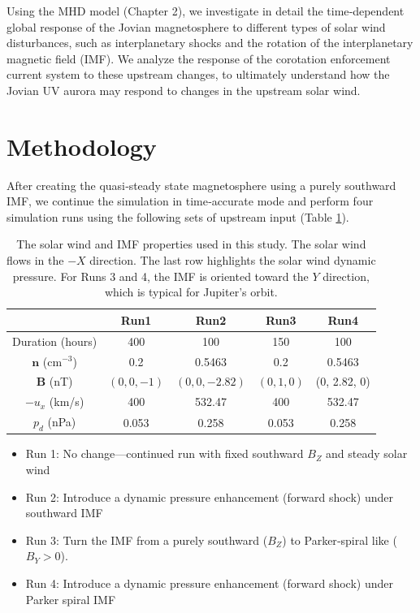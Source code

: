 Using the MHD model (Chapter 2), we investigate in detail the time‐dependent global response of the Jovian magnetosphere to different types of solar wind disturbances, such as interplanetary shocks and the rotation of the interplanetary magnetic field (IMF). We analyze the response of the corotation enforcement current system to these upstream changes, to ultimately understand how the Jovian UV aurora may respond to changes in the upstream solar wind.

\section{Methodology}

After creating the quasi‐steady state magnetosphere using a purely southward IMF, we continue the simulation in time‐accurate mode and perform four simulation runs using the following sets of upstream input (Table \ref{tab:sw-conditions}). 

\begin{table}
    \centering
    \begin{tabular}{c|c|c|c|c}
         &Run1  &Run2   &Run3   &Run4  \\
    \hline
    Duration (hours) &400   &100    &150    &100\\
    $\mathbf{n}$ (cm$^{-3}$)    &0.2    &0.5463  &0.2   &0.5463\\
    $\mathbf{B}$ (nT)           &$(0,0,-1)$ &$(0,0,-2.82)$ &$(0, 1, 0)$ &(0, 2.82, 0)\\
    $-u_x$ (km/s)               &400    &532.47     &400    &532.47\\
    $p_d$ (nPa)                 &0.053  &0.258  &0.053  &0.258
    \end{tabular}
    \caption{The solar wind and IMF properties used in this study. The solar wind flows in the $-X$ direction. The last row highlights the solar wind dynamic pressure. For Runs 3 and 4, the IMF is oriented toward the $Y$ direction, which is typical for Jupiter's orbit.}
    \label{tab:sw-conditions}
\end{table}

\begin{itemize}
    \item Run 1: No change—continued run with fixed southward $B_Z$ and steady solar wind
    \item Run 2: Introduce a dynamic pressure enhancement (forward shock) under southward IMF
    \item Run 3: Turn the IMF from a purely southward ($B_Z$) to Parker‐spiral like ($B_Y > 0$).
    \item Run 4: Introduce a dynamic pressure enhancement (forward shock) under Parker spiral IMF
\end{itemize}

